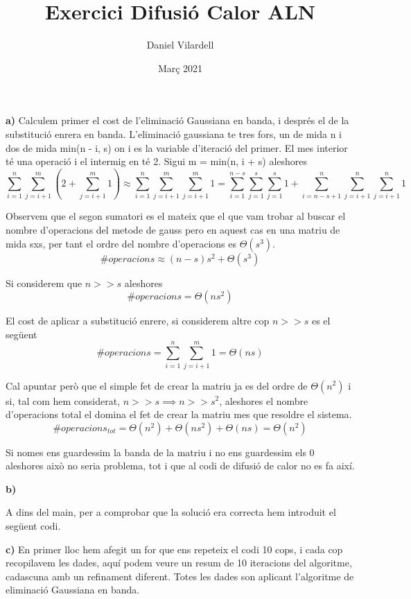 \documentclass[12pt, a4papre]{article}
\author{Daniel Vilardell}
\title{Exercici Difusió Calor ALN}
\date{Març 2021}
\begin{document}
	\maketitle
	
	\textbf{a)} Calculem primer el cost de l'eliminació Gaussiana en banda, i després el de la substitució enrera en banda. L'eliminació gaussiana te tres fors, un de mida n i dos de mida min(n - i, s) on i es la variable d'iteració del primer. El mes interior té una operació i el intermig en té 2. Sigui m = min(n, i + s) aleshores
	\[
		\sum_{i = 1}^n\sum_{j = i + 1}^{m}(2+ \sum_{j = i + 1}^{m}1) \approx \sum_{i = 1}^n\sum_{j = i + 1}^{m}\sum_{j = i + 1}^{m}1 = \sum_{i = 1}^{n - s}\sum_{j =  1}^{s}\sum_{j =  1}^{s}1 + \sum_{i = n - s + 1}^{n}\sum_{j =  i + 1}^{n}\sum_{j =  i + 1}^{n}1
	\]
	
	Observem que el segon sumatori es el mateix que el que vam trobar al buscar el nombre d'operacions del metode de gauss pero en aquest cas en una matriu de mida sxs, per tant el ordre del nombre d'operacions es $\Theta (s^3)$.
	\[
		\#operacions \approx (n - s)s^2 + \Theta (s^3)
	\]
	
	Si considerem que $n >> s$ aleshores 
	\[
		\#operacions = \Theta (ns^2)
	\]
	
	El cost de aplicar a substitució enrere, si considerem altre cop $n >> s$ es el següent
	\[
		\#operacions = \sum_{i = 1}^n\sum_{j = i + 1}^{m}1 = \Theta (ns)
	\]
	
	Cal apuntar però que el simple fet de crear la matriu ja es del ordre de $\Theta (n^2)$ i si, tal com hem considerat, $n >> s \implies n >> s^2$, aleshores el nombre d'operacions total el domina el fet de crear la matriu mes que resoldre el sistema.
	\[
		\#operacions_{tot} =  \Theta (n^2) + \Theta (ns^2) +  \Theta (ns) =  \Theta (n^2)
	\]
	
	Si nomes ens guardessim la banda de la matriu i no ens guardessim els 0 aleshores això no seria problema, tot i que al codi de difusió de calor no es fa així.
	
	\textbf{b)}
	
	
	
	A dins del main, per a comprobar que la solució era correcta hem introduit el següent codi.
	
	
	
	\newpage
	\textbf{c)}
	En primer lloc hem afegit un for que ens repeteix el codi 10 cops, i cada cop recopilavem les dades, aquí podem veure un resum de 10 iteracions del algoritme, cadascuna amb un refinament diferent. Totes les dades son aplicant l'algoritme de eliminació Gaussiana en banda.
	\begin{multicols}{2}
	{\scriptsize {}}
	\end{multicols}
	
\end{document}
